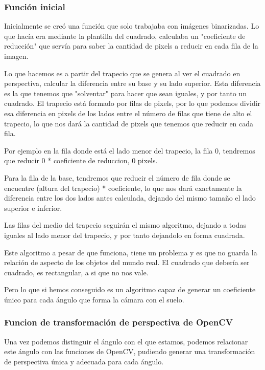 \subsubsection{Función inicial}

Inicialmente se creó una función que solo trabajaba con imágenes binarizadas. Lo que hacía era mediante la plantilla del cuadrado, calculaba un "coeficiente de reducción" que servía para saber la cantidad de pixels a reducir en cada fila de la imagen. 

Lo que hacemos es a partir del trapecio que se genera al ver el cuadrado en perspectiva, calcular la diferencia entre su base y su lado superior. Esta diferencia es la que tenemos que "solventar" para hacer que sean iguales, y por tanto un cuadrado. 
El trapecio está formado por filas de pixels, por lo que podemos dividir esa diferencia en pixels de los lados entre el número de filas que tiene de alto el trapecio, lo que nos dará la cantidad de pixels que tenemos que reducir en cada fila.

Por ejemplo en la fila donde está el lado menor del trapecio, la fila 0, tendremos que reducir 0 * coeficiente de reduccion, 0 pixels.

Para la fila de la base, tendremos que reducir el número de fila donde se encuentre (altura del trapecio) * coeficiente, lo que nos dará exactamente la diferencia entre los dos lados antes calculada, dejando del mismo tamaño el lado superior e inferior.

Las filas del medio del trapecio seguirán el mismo algoritmo, dejando a todas iguales al lado menor del trapecio, y por tanto dejandolo en forma cuadrada.

Este algoritmo a pesar de que funciona, tiene un problema y es que no guarda la relación de aspecto de los objetos del mundo real. El cuadrado que debería ser cuadrado, es rectangular, a si que no nos vale.

Pero lo que si hemos conseguido es un algoritmo capaz de generar un coeficiente único para cada ángulo que forma la cámara con el suelo.

\subsubsection{Funcion de transformación de perspectiva de OpenCV}

Una vez podemos distinguir el ángulo con el que estamos, podemos relacionar este ángulo con las funciones de OpenCV, pudiendo generar una transformación de perspectiva única y adecuada para cada ángulo.


